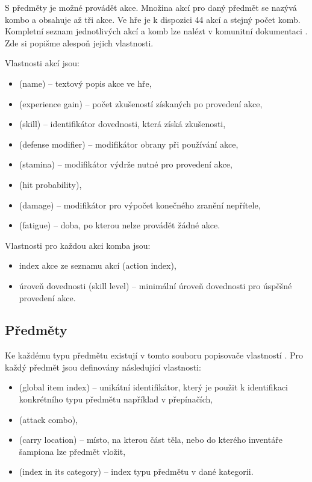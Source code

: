 S předměty je možné provádět akce. Množina akcí pro daný předmět se nazývá kombo a obsahuje 
až tři akce. Ve hře je k dispozici 44 akcí a stejný počet komb. Kompletní seznam jednotlivých
akcí a komb lze nalézt v komunitní dokumentaci \cite{DMActions}. Zde si popišme alespoň jejich vlastnosti.

\medskip

Vlastnosti akcí jsou:
\begin{itemize}
\item {} (name) -- textový popis akce ve hře,
\item {} (experience gain) -- počet zkušeností získaných po provedení akce,
\item {} (skill) -- identifikátor dovednosti, která získá zkušenosti,
\item {} (defense modifier) -- modifikátor obrany při používání akce,
\item {} (stamina) -- modifikátor výdrže nutné pro provedení akce, 
\item {} (hit probability),
\item {} (damage) -- modifikátor pro výpočet konečného zranění nepřítele, 
\item {} (fatigue) -- doba, po kterou nelze provádět žádné akce. 
\end{itemize}

\medskip

Vlastnosti pro každou akci komba jsou:
\begin{itemize}
\item index akce ze seznamu akcí (action index), 
\item úroveň dovednosti (skill level) -- minimální úroveň dovednosti pro úspěšné provedení akce. 
\end{itemize}


\subsection{Předměty}\label{item-descriptors}

Ke každému typu předmětu existují v tomto souboru popisovače vlastností \cite{DMItemDescriptors}.
Pro každý předmět jsou definovány následující vlastnosti:  
\begin{itemize}
\item {} (global item index) -- unikátní identifikátor, který je použit k identifikaci konkrétního typu předmětu například v přepínačích,
\item {} (attack combo),
\item {} (carry location) -- místo, na kterou část těla, nebo do kterého inventáře šampiona lze předmět vložit,
\item {} (index in its category) -- index typu předmětu v dané kategorii.
\end{itemize}

